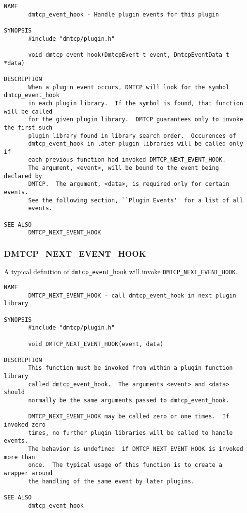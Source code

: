 \documentclass{article}
\begin{document}
\begin{verbatim}
NAME
       dmtcp_event_hook - Handle plugin events for this plugin

SYNOPSIS
       #include "dmtcp/plugin.h"

       void dmtcp_event_hook(DmtcpEvent_t event, DmtcpEventData_t *data)

DESCRIPTION
       When a plugin event occurs, DMTCP will look for the symbol dmtcp_event_hook
       in each plugin library.  If the symbol is found, that function will be called
       for the given plugin library.  DMTCP guarantees only to invoke the first such
       plugin library found in library search order.  Occurences of
       dmtcp_event_hook in later plugin libraries will be called only if
       each previous function had invoked DMTCP_NEXT_EVENT_HOOK.
       The argument, <event>, will be bound to the event being declared by
       DMTCP.  The argument, <data>, is required only for certain events.
       See the following section, ``Plugin Events'' for a list of all
       events.

SEE ALSO
       DMTCP_NEXT_EVENT_HOOK
\end{verbatim}

\subsubsection{DMTCP\_NEXT\_EVENT\_HOOK}

A typical definition of {\tt dmtcp\_event\_hook} will invoke
{\tt DMTCP\_NEXT\_EVENT\_HOOK}.

\begin{verbatim}
NAME
       DMTCP_NEXT_EVENT_HOOK - call dmtcp_event_hook in next plugin library

SYNOPSIS
       #include "dmtcp/plugin.h"

       void DMTCP_NEXT_EVENT_HOOK(event, data)

DESCRIPTION
       This function must be invoked from within a plugin function library
       called dmtcp_event_hook.  The arguments <event> and <data> should
       normally be the same arguments passed to dmtcp_event_hook.

       DMTCP_NEXT_EVENT_HOOK may be called zero or one times.  If invoked zero
       times, no further plugin libraries will be called to handle events.
       The behavior is undefined  if DMTCP_NEXT_EVENT_HOOK is invoked more than
       once.  The typical usage of this function is to create a wrapper around
       the handling of the same event by later plugins.

SEE ALSO
       dmtcp_event_hook
\end{verbatim}
\end{document}
